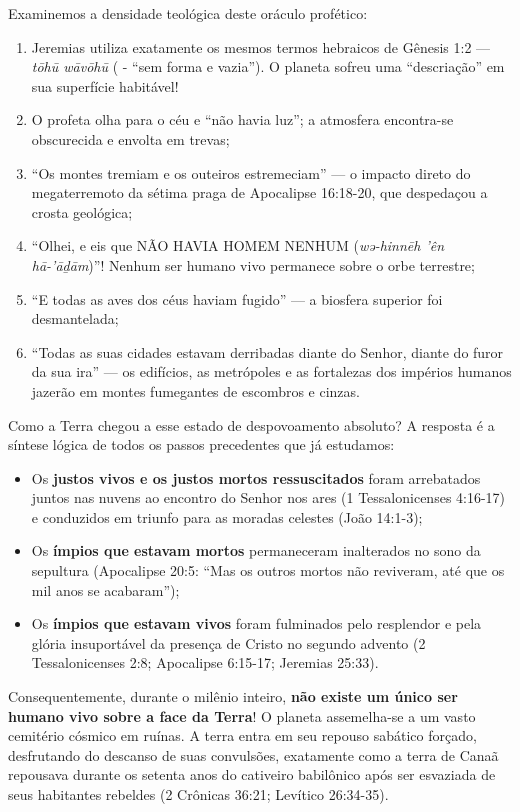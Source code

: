 Examinemos a densidade teológica deste oráculo profético:
\begin{enumerate}
  \item Jeremias utiliza exatamente os mesmos termos hebraicos de Gênesis 1:2 — \textit{tōhū wāvōhū} ( - ``sem forma e vazia''). O planeta sofreu uma ``descriação'' em sua superfície habitável!
  \item O profeta olha para o céu e ``não havia luz''; a atmosfera encontra-se obscurecida e envolta em trevas;
  \item ``Os montes tremiam e os outeiros estremeciam'' — o impacto direto do megaterremoto da sétima praga de Apocalipse 16:18-20, que despedaçou a crosta geológica;
  \item ``Olhei, e eis que NÃO HAVIA HOMEM NENHUM (\textit{wə-hinnēh ’ên hā-’āḏām})''! Nenhum ser humano vivo permanece sobre o orbe terrestre;
  \item ``E todas as aves dos céus haviam fugido'' — a biosfera superior foi desmantelada;
  \item ``Todas as suas cidades estavam derribadas diante do Senhor, diante do furor da sua ira'' — os edifícios, as metrópoles e as fortalezas dos impérios humanos jazerão em montes fumegantes de escombros e cinzas.
\end{enumerate}


Como a Terra chegou a esse estado de despovoamento absoluto?
A resposta é a síntese lógica de todos os passos precedentes que já estudamos:
\begin{itemize}
  \item Os \textbf{justos vivos e os justos mortos ressuscitados} foram arrebatados juntos nas nuvens ao encontro do Senhor nos ares (1 Tessalonicenses 4:16-17) e conduzidos em triunfo para as moradas celestes (João 14:1-3);
  \item Os \textbf{ímpios que estavam mortos} permaneceram inalterados no sono da sepultura (Apocalipse 20:5: ``Mas os outros mortos não reviveram, até que os mil anos se acabaram'');
  \item Os \textbf{ímpios que estavam vivos} foram fulminados pelo resplendor e pela glória insuportável da presença de Cristo no segundo advento (2 Tessalonicenses 2:8; Apocalipse 6:15-17; Jeremias 25:33).
\end{itemize}


Consequentemente, durante o milênio inteiro, \textbf{não existe um único ser humano vivo sobre a face da Terra}! O planeta assemelha-se a um vasto cemitério cósmico em ruínas. A terra entra em seu repouso sabático forçado, desfrutando do descanso de suas convulsões, exatamente como a terra de Canaã repousava durante os setenta anos do cativeiro babilônico após ser esvaziada de seus habitantes rebeldes (2 Crônicas 36:21; Levítico 26:34-35).



